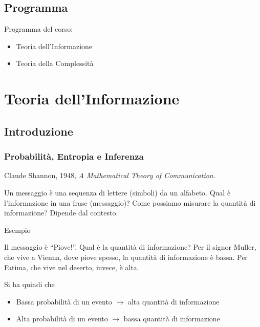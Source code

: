 \chapter*{Programma}

Programma del corso:
\begin{itemize}
    \item Teoria dell'Informazione
    \item Teoria della Complessità
\end{itemize}





\part{Teoria dell'Informazione}

\chapter{Introduzione}

\section{Probabilità, Entropia e Inferenza}
Claude Shannon, 1948, \textit{A Mathematical Theory of Communication}.

Un messaggio è una sequenza di lettere (simboli) da un alfabeto. Qual è l'informazione in una frase (messaggio)? Come possiamo misurare la quantità di informazione? Dipende dal contesto.

\subparagraph{Esempio} Il messaggio è ``Piove!''. Qual è la quantità di informazione? Per il signor Muller, che vive a Vienna, dove piove spesso, la quantità di informazione è bassa. Per Fatima, che vive nel deserto, invece, è alta.\bigskip

Si ha quindi che
\begin{itemize}
    \item Bassa probabilità di un evento $\to$ alta quantità di informazione
    \item Alta probabilità di un evento $\to$ bassa quantità di informazione
\end{itemize}

